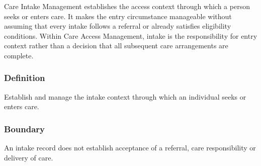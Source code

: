 Care Intake Management establishes the access context through which a person seeks or enters care. It makes the entry circumstance manageable without assuming that every intake follows a referral or already satisfies eligibility conditions. Within Care Access Management, intake is the responsibility for entry context rather than a decision that all subsequent care arrangements are complete.

\subsubsection*{Definition}

Establish and manage the intake context through which an individual seeks or enters care.

\subsubsection*{Boundary}

An intake record does not establish acceptance of a referral, care responsibility or delivery of care.

